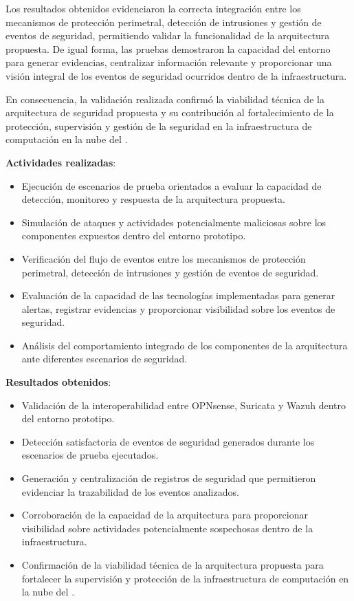 Los resultados obtenidos evidenciaron la correcta integración entre los mecanismos de protección perimetral, detección de 
intrusiones y gestión de eventos de seguridad, permitiendo validar la funcionalidad de la arquitectura propuesta. De igual 
forma, las pruebas demostraron la capacidad del entorno para generar evidencias, centralizar información relevante y 
proporcionar una visión integral de los eventos de seguridad ocurridos dentro de la infraestructura.

En consecuencia, la validación realizada confirmó la viabilidad técnica de la arquitectura de seguridad propuesta y su 
contribución al fortalecimiento de la protección, supervisión y gestión de la seguridad en la infraestructura de 
computación en la nube del \GRID.

\textbf{Actividades realizadas}:
\begin{itemize}
	\item Ejecución de escenarios de prueba orientados a evaluar la capacidad de detección, monitoreo y respuesta de la arquitectura propuesta.
	\item Simulación de ataques y actividades potencialmente maliciosas sobre los componentes expuestos dentro del entorno prototipo.
	\item Verificación del flujo de eventos entre los mecanismos de protección perimetral, detección de intrusiones y gestión de eventos de seguridad.
	\item Evaluación de la capacidad de las tecnologías implementadas para generar alertas, registrar evidencias y proporcionar visibilidad sobre los eventos de seguridad.
	\item Análisis del comportamiento integrado de los componentes de la arquitectura ante diferentes escenarios de seguridad.
\end{itemize}

\textbf{Resultados obtenidos}:
\begin{itemize}
	\item Validación de la interoperabilidad entre OPNsense, Suricata y Wazuh dentro del entorno prototipo.
	\item Detección satisfactoria de eventos de seguridad generados durante los escenarios de prueba ejecutados.
	\item Generación y centralización de registros de seguridad que permitieron evidenciar la trazabilidad de los eventos analizados.
	\item Corroboración de la capacidad de la arquitectura para proporcionar visibilidad sobre actividades potencialmente sospechosas dentro de la infraestructura.
	\item Confirmación de la viabilidad técnica de la arquitectura propuesta para fortalecer la supervisión y protección de la infraestructura de computación en la nube del \GRID.
\end{itemize}


